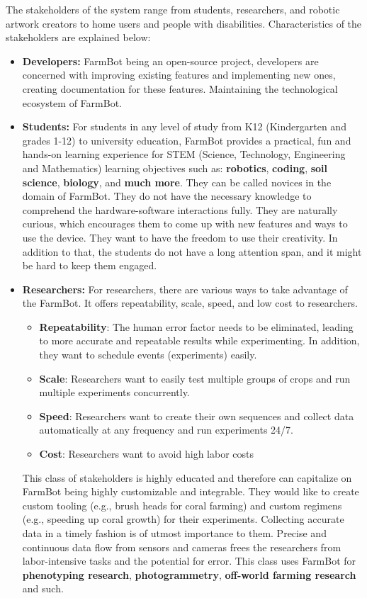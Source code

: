 The stakeholders of the system range from students, researchers, and robotic artwork creators to home users and people with disabilities. Characteristics of the stakeholders are explained below:
\begin{itemize}
    \item \textbf{Developers:} FarmBot being an open-source project, developers are concerned with improving existing features and implementing new ones, creating documentation for these features. Maintaining the technological ecosystem of FarmBot.

    \item \textbf{Students:} For students in any level of study from K12 (Kindergarten and grades 1-12) to university education, FarmBot provides a practical, fun and hands-on learning experience for STEM (Science, Technology, Engineering and Mathematics) learning objectives such as: \textbf{robotics}, \textbf{coding}, \textbf{soil science}, \textbf{biology}, and \textbf{much more}. They can be called novices in the domain of FarmBot. They do not have the necessary knowledge to comprehend the hardware-software interactions fully. They are naturally curious, which encourages them to come up with new features and ways to use the device. They want to have the freedom to use their creativity. In addition to that, the students do not have a long attention span, and it might be hard to keep them engaged.

    \item \textbf{Researchers:} For researchers, there are various ways to take advantage of the FarmBot. It offers repeatability, scale, speed, and low cost to researchers.
    \begin{itemize}
        \item \textbf{Repeatability}: The human error factor needs to be eliminated, leading to more accurate and repeatable results while experimenting. In addition, they want to schedule events (experiments) easily.
        \item \textbf{Scale}: Researchers want to easily test multiple groups of crops and run multiple experiments concurrently.
        \item \textbf{Speed}: Researchers want to create their own sequences and collect data automatically at any frequency and run experiments 24/7.
        \item \textbf{Cost}: Researchers want to avoid high labor costs
    \end{itemize}
    This class of stakeholders is highly educated and therefore can capitalize on FarmBot being highly customizable and integrable. They would like to create custom tooling (e.g., brush heads for coral farming) and custom regimens (e.g., speeding up coral growth) for their experiments. Collecting accurate data in a timely fashion is of utmost importance to them. Precise and continuous data flow from sensors and cameras frees the researchers from labor-intensive tasks and the potential for error. This class uses FarmBot for \textbf{phenotyping research}, \textbf{photogrammetry}, \textbf{off-world farming research} and such.


\end{itemize}
